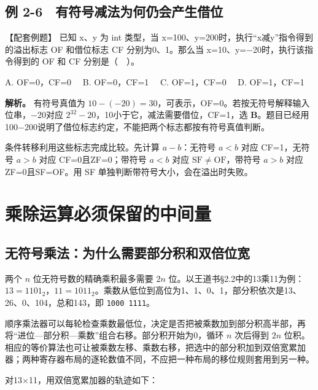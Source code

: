 \subsection{例 2-6　有符号减法为何仍会产生借位}\label{CO02-14}

\begin{example}[配套例题]

【配套例题】 已知 x、y 为 int 类型，当 x=100、y=200时，执行``x减y''指令得到的溢出标志 OF 和借位标志 CF 分别为0、1。那么当 x=10、y=\ensuremath{-}20时，执行该指令得到的 OF 和 CF 分别是（　）。

A. OF=0，CF=0　 B. OF=0，CF=1　 C. OF=1，CF=0　 D. OF=1，CF=1

\end{example}

\textbf{解析。} 有符号真值为 \(10-(-20)=30\)，可表示，OF=0。若按无符号解释输入位串，\ensuremath{-}20对应 \(2^{32}-20\)，10小于它，减法需要借位，CF=1，选 \textbf{B}。题目已经用100\ensuremath{-}200说明了借位标志约定，不能把两个标志都按有符号真值判断。

条件转移利用这些标志完成比较。先计算 \(a-b\)：无符号 \(a<b\) 对应 CF=1，无符号 \(a>b\) 对应 CF=0且ZF=0；带符号 \(a<b\) 对应 \(\mathrm{SF}\ne\mathrm{OF}\)，带符号 \(a>b\) 对应ZF=0且SF=OF。用 SF 单独判断带符号大小，会在溢出时失败。

\section{乘除运算必须保留的中间量}\label{CO02-15}

\subsection{无符号乘法：为什么需要部分积和双倍位宽}\label{CO02-16}

两个 \(n\) 位无符号数的精确乘积最多需要 \(2n\) 位。以王道书§2.2中的13乘11为例：\(13=1101_2\)，\(11=1011_2\)。乘数从低位到高位为1、1、0、1，部分积依次是13、26、0、104，总和143，即 \texttt{1000 1111}。

顺序乘法器可以每轮检查乘数最低位，决定是否把被乘数加到部分积高半部，再将``进位---部分积---乘数''组合右移。部分积开始为0，循环 \(n\) 次后得到 \(2n\) 位积。相应的等价算法也可让被乘数左移、乘数右移，把选中的部分积加到双倍宽累加器；两种寄存器布局的逐轮数值不同，不应把一种布局的移位规则套用到另一种。

对13\ensuremath{\times}11，用双倍宽累加器的轨迹如下：

